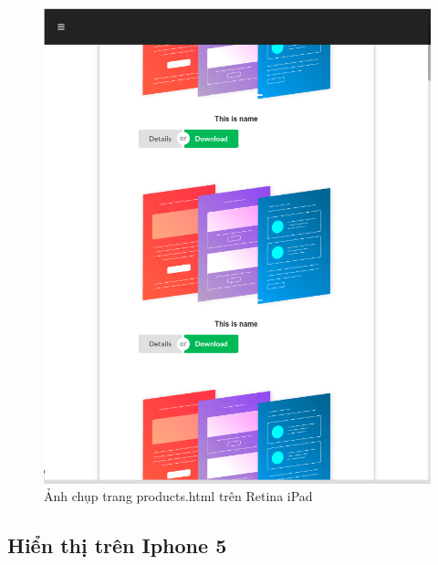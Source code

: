 \documentclass[a4paper]{article}
\begin{document}
\begin{figure}[H]
\begin{center}
\includegraphics[page=1, scale=0.215]{screenshot/retina4.png}
\caption{Ảnh chụp trang products.html trên Retina iPad}
\end{center}
\end{figure}



\subsection{Hiển thị trên Iphone 5}
\end{document}
